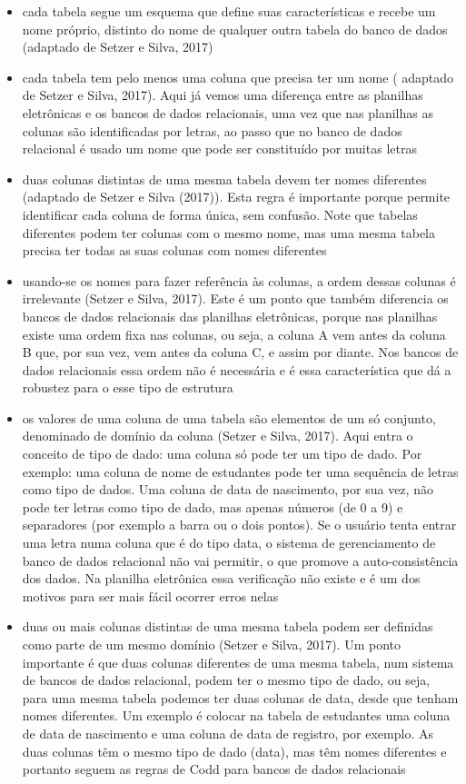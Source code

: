 \begin{itemize}
\item cada tabela segue um esquema que define suas características e recebe um nome próprio, distinto do nome de qualquer outra tabela do banco de dados (adaptado de Setzer e Silva, 2017)
\item cada tabela tem pelo menos uma coluna que precisa ter um nome ( adaptado de Setzer e Silva, 2017). Aqui já vemos uma diferença entre as planilhas eletrônicas e os bancos de dados relacionais, uma vez que nas planilhas as colunas são identificadas por letras, ao passo que no banco de dados relacional é usado um nome que pode ser constituído por muitas letras
\item duas colunas distintas de uma mesma tabela devem ter nomes diferentes (adaptado de Setzer e Silva (2017)). Esta regra é importante porque permite identificar cada coluna de forma única, sem confusão. Note que tabelas diferentes podem ter colunas com o mesmo nome, mas uma mesma tabela precisa ter todas as suas colunas com nomes diferentes
\item usando-se os nomes para fazer referência às colunas, a ordem dessas colunas é irrelevante  (Setzer e Silva, 2017). Este é um ponto que também diferencia os bancos de dados relacionais das planilhas eletrônicas, porque nas planilhas existe uma ordem fixa nas colunas, ou seja, a coluna A vem antes da coluna B que, por sua vez, vem antes da coluna C, e assim por diante. Nos bancos de dados relacionais essa ordem não é necessária e é essa característica que dá a robustez para o esse tipo de estrutura
\item os valores de uma coluna de uma tabela são elementos de um só conjunto, denominado de domínio da coluna  (Setzer e Silva, 2017). Aqui entra o conceito de tipo de dado: uma coluna só pode ter um tipo de dado. Por exemplo: uma coluna de nome de estudantes pode ter uma sequência de letras como tipo de dados. Uma coluna de data de nascimento, por sua vez, não pode ter letras como tipo de dado, mas apenas números (de 0 a 9) e separadores (por exemplo a barra ou o dois pontos). Se o usuário tenta entrar uma letra numa coluna que é do tipo data, o sistema de gerenciamento de banco de dados relacional não vai permitir, o que promove a auto-consistência dos dados. Na planilha eletrônica essa verificação não existe e é um dos motivos para ser mais fácil ocorrer erros nelas
\item duas ou mais colunas distintas de uma mesma tabela podem ser definidas como parte de um mesmo domínio  (Setzer e Silva, 2017). Um ponto importante é que duas colunas diferentes de uma mesma tabela, num sistema de bancos de dados relacional, podem ter o mesmo tipo de dado, ou seja, para uma mesma tabela podemos ter duas colunas de data, desde que tenham nomes diferentes. Um exemplo é colocar na tabela de estudantes uma coluna de data de nascimento e uma coluna de data de registro, por exemplo. As duas colunas têm o mesmo tipo de dado (data), mas têm nomes diferentes e portanto seguem as regras de Codd para bancos de dados relacionais

\end{itemize}
